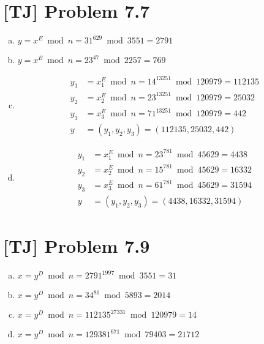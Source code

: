 \documentclass[a4paper,11pt]{article}
\begin{document}
  \section{[TJ] Problem 7.7}
  \begin{enumerate}[(a)]
    \item $y = x^E \bmod n = 31^{629} \bmod 3551 = 2791$
    \item $y = x^E \bmod n = 23^{47} \bmod 2257 = 769$
    \item
      \begin{align*}
        y_1 &= x_1^E \bmod n = 14^{13251} \bmod 120979 = 112135 \\
        y_2 &= x_2^E \bmod n = 23^{13251} \bmod 120979 = 25032 \\
        y_3 &= x_3^E \bmod n = 71^{13251} \bmod 120979 = 442 \\
        y &= (y_1, y_2, y_3) = (112135, 25032, 442)
      \end{align*}
    \item
      \begin{align*}
        y_1 &= x_1^E \bmod n = 23^{781} \bmod 45629 = 4438 \\
        y_2 &= x_2^E \bmod n = 15^{781} \bmod 45629 = 16332 \\
        y_3 &= x_3^E \bmod n = 61^{781} \bmod 45629 = 31594 \\
        y &= (y_1, y_2, y_3) = (4438, 16332, 31594)
      \end{align*}
  \end{enumerate}

  \section{[TJ] Problem 7.9}
  \begin{enumerate}[(a)]
    \item $ x = y^D \bmod n = 2791^{1997} \bmod 3551 = 31$
    \item $ x = y^D \bmod n = 34^{81} \bmod 5893 = 2014$
    \item $ x = y^D \bmod n = 112135^{27331} \bmod 120979 = 14$
    \item $ x = y^D \bmod n = 129381^{671} \bmod 79403 = 21712$
  \end{enumerate}
\end{document}
